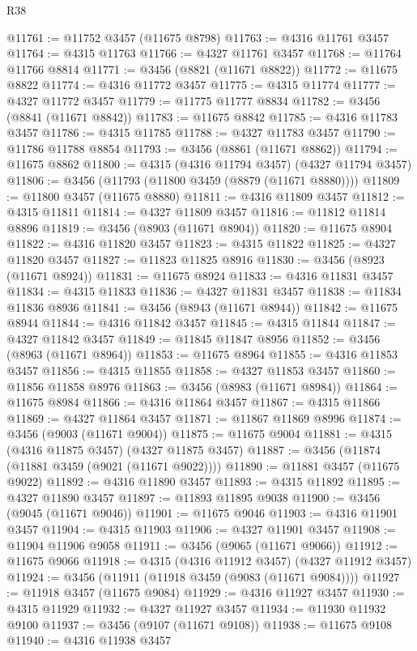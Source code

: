 \begin{lexlean}{R38}
\begin{coremodule}
@11761 := @11752 @3457 (@11675 @8798)
@11763 := @4316 @11761 @3457
@11764 := @4315 @11763
@11766 := @4327 @11761 @3457
@11768 := @11764 @11766 @8814
@11771 := @3456 (@8821 (@11671 @8822))
@11772 := @11675 @8822
@11774 := @4316 @11772 @3457
@11775 := @4315 @11774
@11777 := @4327 @11772 @3457
@11779 := @11775 @11777 @8834
@11782 := @3456 (@8841 (@11671 @8842))
@11783 := @11675 @8842
@11785 := @4316 @11783 @3457
@11786 := @4315 @11785
@11788 := @4327 @11783 @3457
@11790 := @11786 @11788 @8854
@11793 := @3456 (@8861 (@11671 @8862))
@11794 := @11675 @8862
@11800 := @4315 (@4316 @11794 @3457) (@4327 @11794 @3457)
@11806 := @3456 (@11793 (@11800 @3459 (@8879 (@11671 @8880))))
@11809 := @11800 @3457 (@11675 @8880)
@11811 := @4316 @11809 @3457
@11812 := @4315 @11811
@11814 := @4327 @11809 @3457
@11816 := @11812 @11814 @8896
@11819 := @3456 (@8903 (@11671 @8904))
@11820 := @11675 @8904
@11822 := @4316 @11820 @3457
@11823 := @4315 @11822
@11825 := @4327 @11820 @3457
@11827 := @11823 @11825 @8916
@11830 := @3456 (@8923 (@11671 @8924))
@11831 := @11675 @8924
@11833 := @4316 @11831 @3457
@11834 := @4315 @11833
@11836 := @4327 @11831 @3457
@11838 := @11834 @11836 @8936
@11841 := @3456 (@8943 (@11671 @8944))
@11842 := @11675 @8944
@11844 := @4316 @11842 @3457
@11845 := @4315 @11844
@11847 := @4327 @11842 @3457
@11849 := @11845 @11847 @8956
@11852 := @3456 (@8963 (@11671 @8964))
@11853 := @11675 @8964
@11855 := @4316 @11853 @3457
@11856 := @4315 @11855
@11858 := @4327 @11853 @3457
@11860 := @11856 @11858 @8976
@11863 := @3456 (@8983 (@11671 @8984))
@11864 := @11675 @8984
@11866 := @4316 @11864 @3457
@11867 := @4315 @11866
@11869 := @4327 @11864 @3457
@11871 := @11867 @11869 @8996
@11874 := @3456 (@9003 (@11671 @9004))
@11875 := @11675 @9004
@11881 := @4315 (@4316 @11875 @3457) (@4327 @11875 @3457)
@11887 := @3456 (@11874 (@11881 @3459 (@9021 (@11671 @9022))))
@11890 := @11881 @3457 (@11675 @9022)
@11892 := @4316 @11890 @3457
@11893 := @4315 @11892
@11895 := @4327 @11890 @3457
@11897 := @11893 @11895 @9038
@11900 := @3456 (@9045 (@11671 @9046))
@11901 := @11675 @9046
@11903 := @4316 @11901 @3457
@11904 := @4315 @11903
@11906 := @4327 @11901 @3457
@11908 := @11904 @11906 @9058
@11911 := @3456 (@9065 (@11671 @9066))
@11912 := @11675 @9066
@11918 := @4315 (@4316 @11912 @3457) (@4327 @11912 @3457)
@11924 := @3456 (@11911 (@11918 @3459 (@9083 (@11671 @9084))))
@11927 := @11918 @3457 (@11675 @9084)
@11929 := @4316 @11927 @3457
@11930 := @4315 @11929
@11932 := @4327 @11927 @3457
@11934 := @11930 @11932 @9100
@11937 := @3456 (@9107 (@11671 @9108))
@11938 := @11675 @9108
@11940 := @4316 @11938 @3457

\end{coremodule}
\end{lexlean}
